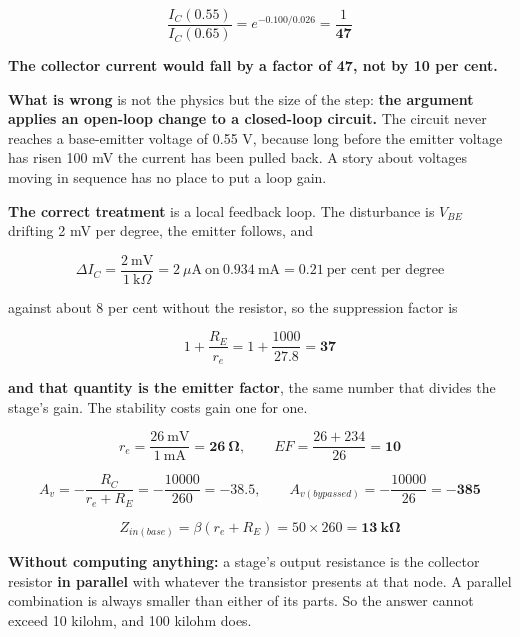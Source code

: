 
\[
  \frac{I_C(0.55)}{I_C(0.65)} = e^{-0.100/0.026} = \frac{1}{\mathbf{47}}
\]

\textbf{The collector current would fall by a factor of 47, not by 10 per cent.}

\textbf{What is wrong} is not the physics but the size of the step: \textbf{the argument applies an open-loop change to a closed-loop circuit.} The circuit never reaches a base-emitter voltage of 0.55 V, because long before the emitter voltage has risen 100 mV the current has been pulled back. A story about voltages moving in sequence has no place to put a loop gain.

\textbf{The correct treatment} is a local feedback loop. The disturbance is $V_{BE}$ drifting 2 mV per degree, the emitter follows, and

\[
  \Delta I_C = \frac{2\ \text{mV}}{1\ \text{k}\Omega} = 2\ \mu\text{A}
  \ \text{on}\ 0.934\ \text{mA} = 0.21\ \text{per cent per degree}
\]

against about 8 per cent without the resistor, so the suppression factor is

\[
  1 + \frac{R_E}{r_e} = 1 + \frac{1000}{27.8} = \mathbf{37}
\]

\textbf{and that quantity is the emitter factor}, the same number that divides the stage's gain. The stability costs gain one for one.



\[
  r_e = \frac{26\ \text{mV}}{1\ \text{mA}} = \mathbf{26\ \Omega}, \qquad
  EF = \frac{26 + 234}{26} = \mathbf{10}
\]

\[
  A_v = -\frac{R_C}{r_e + R_E} = -\frac{10000}{260} = \mathbf{-38.5}, \qquad
  A_{v(bypassed)} = -\frac{10000}{26} = \mathbf{-385}
\]

\[
  Z_{in(base)} = \beta(r_e + R_E) = 50 \times 260 = \mathbf{13\ \text{k}\Omega}
\]


\textbf{Without computing anything:} a stage's output resistance is the collector resistor \textbf{in parallel} with whatever the transistor presents at that node. A parallel combination is always smaller than either of its parts. So the answer cannot exceed 10 kilohm, and 100 kilohm does.

